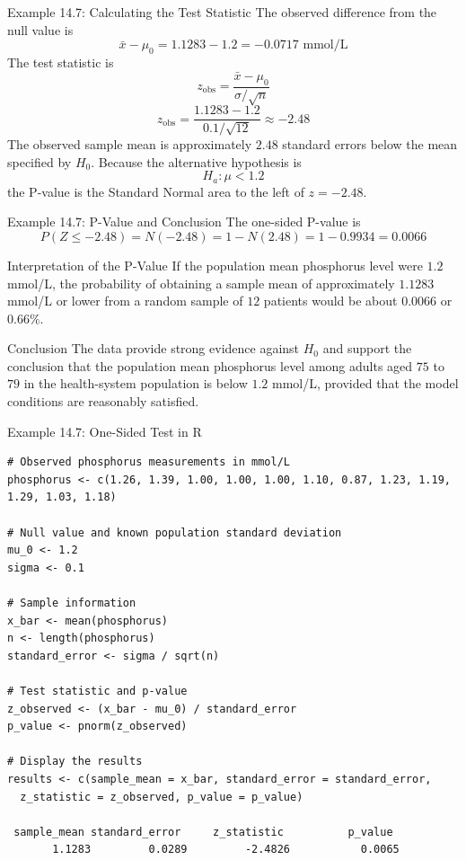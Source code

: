 \documentclass[aspectratio=169]{beamer}
\begin{document}
\begin{frame}{Example 14.7: Calculating the Test Statistic}
The observed difference from the null value is
$$\bar{x}-\mu_0=1.1283-1.2=-0.0717\text{ mmol/L}$$
The test statistic is
$$z_{\mathrm{obs}}=\frac{\bar{x}-\mu_0}{\sigma/\sqrt{n}}$$
$$z_{\mathrm{obs}}=\frac{1.1283-1.2}{0.1/\sqrt{12}}\approx-2.48$$
The observed sample mean is approximately $2.48$ standard errors below the mean specified by $H_0$. Because the alternative hypothesis is
$$H_a:\mu<1.2$$
the P-value is the Standard Normal area to the left of $z=-2.48$.
\end{frame}

\begin{frame}{Example 14.7: P-Value and Conclusion}
The one-sided P-value is
$$P(Z\leq-2.48)=N(-2.48)=1-N(2.48)=1-0.9934=0.0066$$
\begin{block}{Interpretation of the P-Value}
If the population mean phosphorus level were $1.2$ mmol/L, the probability of obtaining a sample mean of approximately $1.1283$ mmol/L or lower from a random sample of $12$ patients would be about $0.0066$ or $0.66\%$.
\end{block}
\begin{block}{Conclusion}
The data provide strong evidence against $H_0$ and support the conclusion that the population mean phosphorus level among adults aged $75$ to $79$ in the health-system population is below $1.2$ mmol/L, provided that the model conditions are reasonably satisfied.
\end{block}
\end{frame}

\begin{frame}[fragile]{Example 14.7: One-Sided Test in R}
\scriptsize
\begin{verbatim}
# Observed phosphorus measurements in mmol/L
phosphorus <- c(1.26, 1.39, 1.00, 1.00, 1.00, 1.10, 0.87, 1.23, 1.19, 1.29, 1.03, 1.18)

# Null value and known population standard deviation
mu_0 <- 1.2
sigma <- 0.1

# Sample information
x_bar <- mean(phosphorus)
n <- length(phosphorus)
standard_error <- sigma / sqrt(n)

# Test statistic and p-value
z_observed <- (x_bar - mu_0) / standard_error
p_value <- pnorm(z_observed)

# Display the results
results <- c(sample_mean = x_bar, standard_error = standard_error,
  z_statistic = z_observed, p_value = p_value)

 sample_mean standard_error     z_statistic          p_value
       1.1283         0.0289         -2.4826           0.0065
\end{verbatim}
\end{frame}
\end{document}

